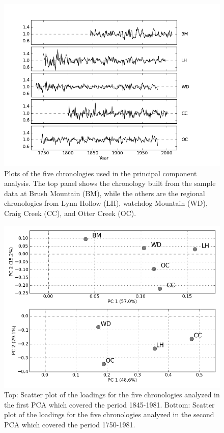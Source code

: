 \begin{figure}
\centering
\includegraphics[width=5in]{figures/stacked_chrons.png}
\caption{Plots of the five chronologies used in the principal component analysis. The top panel shows the chronology built from the sample data at Brush Mountain (BM), while the others are the regional chronologies from Lynn Hollow (LH), watchdog Mountain (WD), Craig Creek (CC), and Otter Creek (OC).}
\label{fig:stackedChrons}
\end{figure}

\begin{figure}
\centering
\includegraphics[width=5in]{figures/scoresPlot.png}
\caption{Top: Scatter plot of the loadings for the five chronologies analyzed in the first PCA which covered the period 1845-1981. Bottom: Scatter plot of the loadings for the five chronologies analyzed in the second PCA which covered the period 1750-1981.}
\label{fig:scores}
\end{figure}

